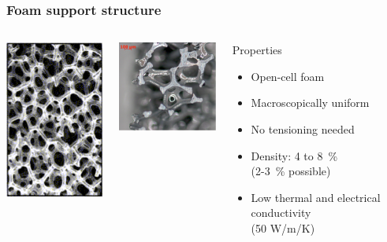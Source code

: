 \documentclass{beamer}
\begin{document}
\begin{frame}
  \frametitle{Foam support structure}

  \vspace{-0.6cm}
  \begin{columns}[t]

    \begin{column}{4cm}
      \begin{center}
        \includegraphics[width = 4cm]{Pictures/foam1.png}
      \end{center}
    \end{column}

    \begin{column}{4cm}
      \begin{center}
        \includegraphics[width = 4cm]{Pictures/foam2.png}
      \end{center}
    \end{column}

    \begin{column}{4cm}
      \vspace{-0.2cm}
      \begin{center}
        \begin{block}{Properties}
          \begin{itemize}
            \item Open-cell foam
            \item Macroscopically uniform
            \item No tensioning needed
            \item Density: 4 to 8~\% \\ (2-3~\% possible)
            \item Low thermal and electrical conductivity \\ (50 W/m/K)
          \end{itemize}
        \end{block}
      \end{center}
    \end{column}

  \end{columns}

\end{frame}
\end{document}
